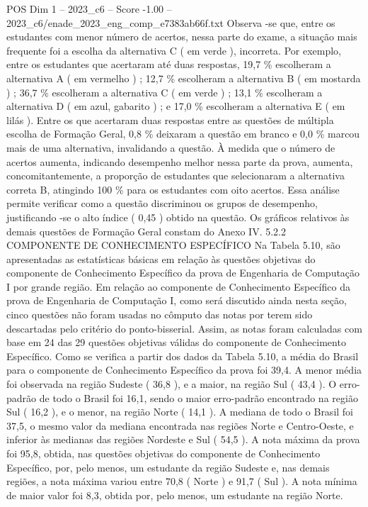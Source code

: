 \begin{textsample}{POS Dim 1 – 2023\_c6 – Score -1.00 – 2023\_c6/enade\_2023\_eng\_comp\_e7383ab66f.txt}
Observa -se que, entre os estudantes com menor número de acertos, nessa parte do exame, a situação mais frequente foi a escolha da alternativa C ( em verde ), incorreta.
Por exemplo, entre os estudantes que acertaram até duas respostas, 19,7 \% escolheram a alternativa A ( em vermelho ) ; 12,7 \% escolheram a alternativa B ( em mostarda ) ; 36,7 \% escolheram a alternativa C ( em verde ) ; 13,1 \% escolheram a alternativa D ( em azul, gabarito ) ; e 17,0 \% escolheram a alternativa E ( em lilás ).
Entre os que acertaram duas respostas entre as questões de múltipla escolha de Formação Geral, 0,8 \% deixaram a questão em branco e 0,0 \% marcou mais de uma alternativa, invalidando a questão.
À medida que o número de acertos aumenta, indicando desempenho melhor nessa parte da prova, aumenta, concomitantemente, a proporção de estudantes que selecionaram a alternativa correta B, atingindo 100 \% para os estudantes com oito acertos.
Essa análise permite verificar como a questão discriminou os grupos de desempenho, justificando -se o alto índice ( 0,45 ) obtido na questão.
Os gráficos relativos às demais questões de Formação Geral constam do Anexo IV. 5.2.2 COMPONENTE DE CONHECIMENTO ESPECÍFICO Na Tabela 5.10, são apresentadas as estatísticas básicas em relação às questões objetivas do componente de Conhecimento Específico da prova de Engenharia de Computação I por grande região.
Em relação ao componente de Conhecimento Específico da prova de Engenharia de Computação I, como será discutido ainda nesta seção, cinco questões não foram usadas no cômputo das notas por terem sido descartadas pelo critério do ponto-bisserial.
Assim, as notas foram calculadas com base em 24 das 29 questões objetivas válidas do componente de Conhecimento Específico.
Como se verifica a partir dos dados da Tabela 5.10, a média do Brasil para o componente de Conhecimento Específico da prova foi 39,4.
A menor média foi observada na região Sudeste ( 36,8 ), e a maior, na região Sul ( 43,4 ).
O erro-padrão de todo o Brasil foi 16,1, sendo o maior erro-padrão encontrado na região Sul ( 16,2 ), e o menor, na região Norte ( 14,1 ).
A mediana de todo o Brasil foi 37,5, o mesmo valor da mediana encontrada nas regiões Norte e Centro-Oeste, e inferior às medianas das regiões Nordeste e Sul ( 54,5 ).
A nota máxima da prova foi 95,8, obtida, nas questões objetivas do componente de Conhecimento Específico, por, pelo menos, um estudante da região Sudeste e, nas demais regiões, a nota máxima variou entre 70,8 ( Norte ) e 91,7 ( Sul ).
A nota mínima de maior valor foi 8,3, obtida por, pelo menos, um estudante na região Norte.

\end{textsample}
